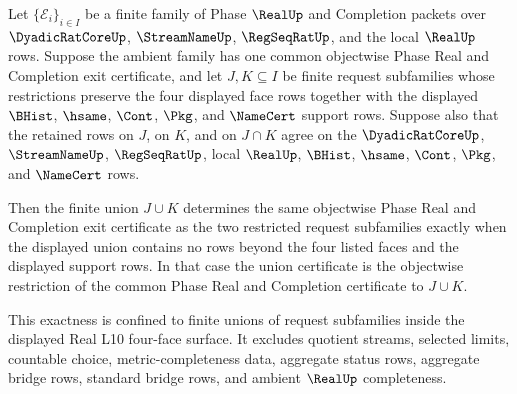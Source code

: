 \begin{theorem}
\label{thm:real-l10-finite-request-union-exit-exactness}
Let $\{\mathcal E_i\}_{i \in I}$ be a finite family of Phase $\RealUp$ and Completion packets over $\DyadicRatCoreUp$, $\StreamNameUp$, $\RegSeqRatUp$, and the local $\RealUp$ rows. Suppose the ambient family has one common objectwise Phase Real and Completion exit certificate, and let $J,K \subseteq I$ be finite request subfamilies whose restrictions preserve the four displayed face rows together with the displayed $\BHist$, $\hsame$, $\Cont$, $\Pkg$, and $\NameCert$ support rows. Suppose also that the retained rows on $J$, on $K$, and on $J \cap K$ agree on the $\DyadicRatCoreUp$, $\StreamNameUp$, $\RegSeqRatUp$, local $\RealUp$, $\BHist$, $\hsame$, $\Cont$, $\Pkg$, and $\NameCert$ rows.

Then the finite union $J \cup K$ determines the same objectwise Phase Real and Completion exit certificate as the two restricted request subfamilies exactly when the displayed union contains no rows beyond the four listed faces and the displayed support rows. In that case the union certificate is the objectwise restriction of the common Phase Real and Completion certificate to $J \cup K$.

This exactness is confined to finite unions of request subfamilies inside the displayed Real L10 four-face surface. It excludes quotient streams, selected limits, countable choice, metric-completeness data, aggregate status rows, aggregate bridge rows, standard bridge rows, and ambient $\RealUp$ completeness.
\end{theorem}

